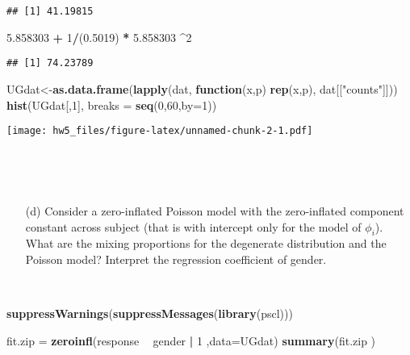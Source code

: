 \documentclass[]{article}
\newenvironment{Shaded}{\begin{snugshade}}{\end{snugshade}}
\newcommand{\KeywordTok}[1]{\textcolor[rgb]{0.13,0.29,0.53}{\textbf{#1}}}
\newcommand{\DataTypeTok}[1]{\textcolor[rgb]{0.13,0.29,0.53}{#1}}
\newcommand{\DecValTok}[1]{\textcolor[rgb]{0.00,0.00,0.81}{#1}}
\newcommand{\FloatTok}[1]{\textcolor[rgb]{0.00,0.00,0.81}{#1}}
\newcommand{\StringTok}[1]{\textcolor[rgb]{0.31,0.60,0.02}{#1}}
\newcommand{\ControlFlowTok}[1]{\textcolor[rgb]{0.13,0.29,0.53}{\textbf{#1}}}
\newcommand{\OperatorTok}[1]{\textcolor[rgb]{0.81,0.36,0.00}{\textbf{#1}}}
\newcommand{\NormalTok}[1]{#1}
\begin{document}
\begin{verbatim}
## [1] 41.19815
\end{verbatim}

\begin{Shaded}
\begin{Highlighting}[]
\FloatTok{5.858303} \OperatorTok{+}\StringTok{ }\DecValTok{1}\OperatorTok{/}\NormalTok{(}\FloatTok{0.5019}\NormalTok{) }\OperatorTok{*}\StringTok{ }\FloatTok{5.858303} \OperatorTok{^}\DecValTok{2}
\end{Highlighting}
\end{Shaded}

\begin{verbatim}
## [1] 74.23789
\end{verbatim}

\begin{Shaded}
\begin{Highlighting}[]
\NormalTok{UGdat<-}\KeywordTok{as.data.frame}\NormalTok{(}\KeywordTok{lapply}\NormalTok{(dat, }\ControlFlowTok{function}\NormalTok{(x,p) }\KeywordTok{rep}\NormalTok{(x,p), dat[[}\StringTok{"counts"}\NormalTok{]]))}
\KeywordTok{hist}\NormalTok{(UGdat[,}\DecValTok{1}\NormalTok{], }\DataTypeTok{breaks =} \KeywordTok{seq}\NormalTok{(}\DecValTok{0}\NormalTok{,}\DecValTok{60}\NormalTok{,}\DataTypeTok{by=}\DecValTok{1}\NormalTok{))}
\end{Highlighting}
\end{Shaded}

\texttt{[image: hw5\_files/figure-latex/unnamed-chunk-2-1.pdf]}

~

\begin{itemize}
     \item[] 

 \end{itemize}

~

\begin{itemize}
     \item[(d)] Consider a zero-inflated Poisson model with the zero-inflated component constant across subject (that is with intercept only for the model of $\phi_i$). What are the mixing proportions for the degenerate distribution and the Poisson model? Interpret the regression coefficient of gender.

 \end{itemize}

~

\begin{Shaded}
\begin{Highlighting}[]
\KeywordTok{suppressWarnings}\NormalTok{(}\KeywordTok{suppressMessages}\NormalTok{(}\KeywordTok{library}\NormalTok{(pscl)))}

\NormalTok{fit.zip =}\StringTok{ }\KeywordTok{zeroinfl}\NormalTok{(response }\OperatorTok{~}\StringTok{ }\NormalTok{gender }\OperatorTok{|}\StringTok{  }\DecValTok{1}\NormalTok{ ,}\DataTypeTok{data=}\NormalTok{UGdat)}
\KeywordTok{summary}\NormalTok{(fit.zip )}
\end{Highlighting}
\end{Shaded}
\end{document}
